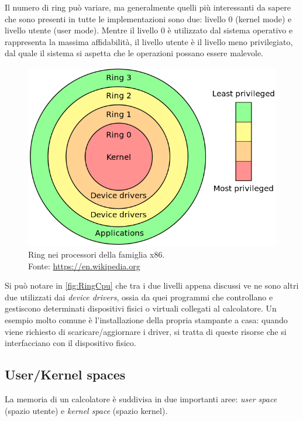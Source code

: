 Il numero di ring può variare, ma generalmente quelli più interessanti da sapere che sono presenti in tutte le implementazioni sono due: livello 0 (kernel mode) e livello utente (user mode). Mentre il livello 0 è utilizzato dal sistema operativo e rappresenta la massima affidabilità, il livello utente è il livello meno privilegiato, dal quale il sistema si aspetta che le operazioni possano essere malevole.

\begin{figure}[!ht]
\centering
\includegraphics[scale=0.3]{Figures/RingCpu}
\caption[Ring nei processori della famiglia x86]{Ring nei processori della famiglia x86.\\Fonte: \href{https://en.wikipedia.org/wiki/Protection_ring}{https://en.wikipedia.org}}
\label{fig:RingCpu}
\end{figure}

Si può notare in \autoref{fig:RingCpu} che tra i due livelli appena discussi ve ne sono altri due utilizzati dai \emph{device drivers}, ossia da quei programmi che controllano e gestiscono determinati dispositivi fisici o virtuali collegati al calcolatore. Un esempio molto comune è l'installazione della propria stampante a casa: quando viene richiesto di scaricare/aggiornare i driver, si tratta di queste risorse che si interfacciano con il dispositivo fisico.

\subsection{User/Kernel spaces}

La memoria di un calcolatore è suddivisa in due importanti aree: \emph{user space} (spazio utente) e \emph{kernel space} (spazio kernel).

